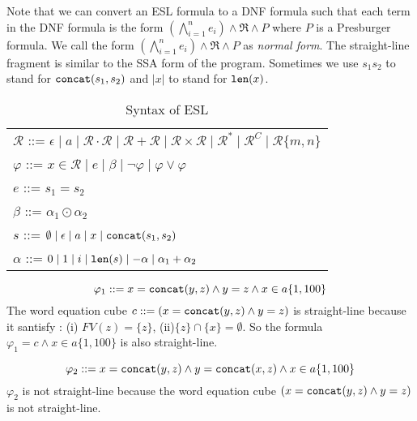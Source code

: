 \documentclass[sigconf]{acmart}
\newcommand*{\regex}{\mathcal{R}}
\begin{document}
Note that we can convert an ESL formula to a DNF formula such that each term in the DNF
formula is the form $(\bigwedge_{i=1}^n e_i) \wedge \Re \wedge P$ where $P$ is a
Presburger formula. We call the form $(\bigwedge_{i=1}^n e_i) \wedge \Re \wedge P$ as \emph{normal form}. The straight-line fragment is similar to the SSA form of the
program.  Sometimes we use $s_1s_2$ to stand for $\verb|concat|(s_1,s_2)$ and $|x|$ to
stand for $\verb|len|(x)$.
\begin{table}
  \begin{tabular}{l}
    $\regex$ ::= $\epsilon\mid a\mid \regex\cdot\regex\mid \regex+\regex\mid \regex\times \regex\mid \regex^*\mid\regex^C \mid \regex\{m,n\}$ \\
    $\varphi$ ::= $x\in \regex\mid e\mid\beta\mid \neg\varphi\mid \varphi\vee\varphi$                                                      \\
    $e$ ::= $s_1=s_2 $                                                                                                                     \\
    $\beta$ ::= $\alpha_1\odot \alpha_2$                                                                                                   \\
    $s$ ::= $\emptyset \mid \epsilon \mid a\mid x\mid \verb|concat|(s_1, s_2)$                                                             \\
    $\alpha$ ::= $0\mid 1\mid i \mid  \verb|len|(s)\mid -\alpha\mid \alpha_1+\alpha_2$
  \end{tabular}
  \caption{Syntax of ESL}
  \label{tab:syntax}
\end{table}

\begin{example}
  \begin{equation} \label{eq:1}
    \varphi_1 ::= x = \verb|concat|(y,z) \wedge y = z \wedge x\in a\{1,100\}
  \end{equation}
  The word equation cube
  $c ::= (x = \verb|concat|(y,z) \wedge y = z)$ is straight-line because it santisfy : (i) $FV(z) = \{z\}$, (ii)$\{z\}\cap\{x\} = \emptyset$. So the formula $\varphi_1 = c\wedge  x\in a\{1,100\}$ is also straight-line.
\end{example}

\begin{example}
  \begin{equation} \label{eq:1}
    \varphi_2 ::=  x = \verb|concat|(y,z) \wedge y = \verb|concat|(x,z) \wedge x\in a\{1,100\}
  \end{equation}
  $\varphi_2$ is not straight-line because the word equation cube\newline
  $(x = \verb|concat|(y,z) \wedge y = z)$ is not straight-line.
\end{example}
\end{document}
